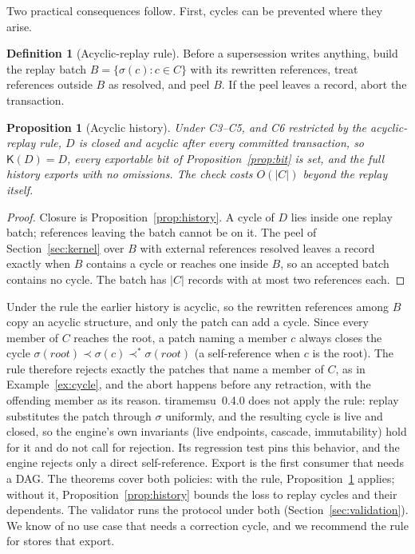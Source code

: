 \documentclass[11pt]{article}
\theoremstyle{plain}
\newtheorem{proposition}[theorem]{Proposition}
\theoremstyle{definition}
\newtheorem{definition}{Definition}
\theoremstyle{remark}
\newcommand{\refs}{\prec}
\newcommand{\Kernel}{\mathsf{K}}
\begin{document}
Two practical consequences follow. First, cycles can be prevented where they arise.

\begin{definition}[Acyclic-replay rule]\label{def:strict}
Before a supersession writes anything, build the replay batch
$B=\{\sigma(c):c\in C\}$ with its rewritten references, treat references outside
$B$ as resolved, and peel $B$. If the peel leaves a record, abort the transaction.
\end{definition}

\begin{proposition}[Acyclic history]\label{prop:strict}
Under C3--C5, and C6 restricted by the acyclic-replay rule, $D$ is closed and acyclic
after every committed transaction, so $\Kernel(D)=D$, every exportable bit of
Proposition~\ref{prop:bit} is set, and the full history exports with no omissions.
The check costs $O(|C|)$ beyond the replay itself.
\end{proposition}
\begin{proof}
Closure is Proposition~\ref{prop:history}. A cycle of $D$ lies inside one replay
batch; references leaving the batch cannot be on it. The peel of
Section~\ref{sec:kernel} over $B$ with external references resolved leaves a
record exactly when $B$ contains a cycle or reaches one inside $B$, so an accepted
batch contains no cycle. The batch has $|C|$ records with at most two references
each.
\end{proof}

Under the rule the earlier history is acyclic, so the rewritten references among
$B$ copy an acyclic structure, and only the patch can add a cycle. Since every
member of $C$ reaches the root, a patch naming a member $c$ always closes the cycle
$\sigma(\mathit{root})\refs\sigma(c)\refs^{*}\sigma(\mathit{root})$ (a self-reference
when $c$ is the root). The rule therefore rejects exactly the patches that name a
member of $C$, as in Example~\ref{ex:cycle}, and the abort happens before any
retraction, with the offending member as its reason. tiramemsu~0.4.0 does not apply the rule: replay
substitutes the patch through $\sigma$ uniformly, and the resulting cycle is live
and closed, so the engine's own invariants (live endpoints, cascade, immutability)
hold for it and do not call for rejection. Its regression test pins this
behavior, and the engine rejects only a direct self-reference. Export is the first
consumer that needs a DAG. The theorems cover both policies: with the rule,
Proposition~\ref{prop:strict} applies; without it, Proposition~\ref{prop:history}
bounds the loss to replay cycles and their dependents. The validator runs the
protocol under both (Section~\ref{sec:validation}). We know of no use case that
needs a correction cycle, and we recommend the rule for stores that export.
\end{document}

